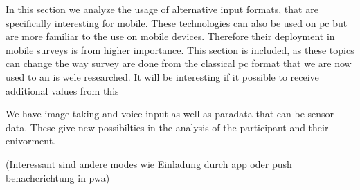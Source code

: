 In this section we analyze the usage of alternative input formats, that are specifically interesting for mobile. These technologies can also be used on pc but are more familiar to the use on mobile devices. Therefore their deployment in mobile surveys is from higher importance. This section is included, as these topics can change the way survey are done from the classical pc format that we are now used to an is wele researched. It will be interesting if it possible to receive additional values from this

We have image taking and voice input as well as paradata that can be sensor data. These give new possibilties in the analysis of the participant and their enivorment. 


(Interessant sind andere modes wie Einladung durch app oder push benachcrichtung in pwa)